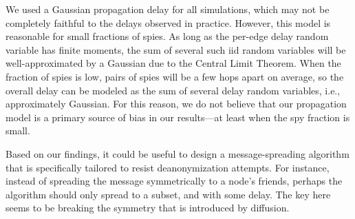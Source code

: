 We used a Gaussian propagation delay for all simulations, which may not be completely faithful to the delays observed in practice. However, this model is reasonable for small fractions of spies. As long as the per-edge delay random variable has finite moments, the sum of several such iid random variables will be well-approximated by a Gaussian due to the Central Limit Theorem. When the fraction of spies is low, pairs of spies will be a few hops apart on average, so the overall delay can be modeled as the sum of several delay random variables, i.e., approximately Gaussian. For this reason, we do not believe that our propagation model is a primary source of bias in our results---at least when the spy fraction is small.

Based on our findings, it could be useful to design a message-spreading algorithm that is specifically tailored to resist deanonymization attempts. For instance, instead of spreading the message symmetrically to a node's friends, perhaps the algorithm should only spread to a subset, and with some delay. The key here seems to be breaking the symmetry that is introduced by diffusion. 